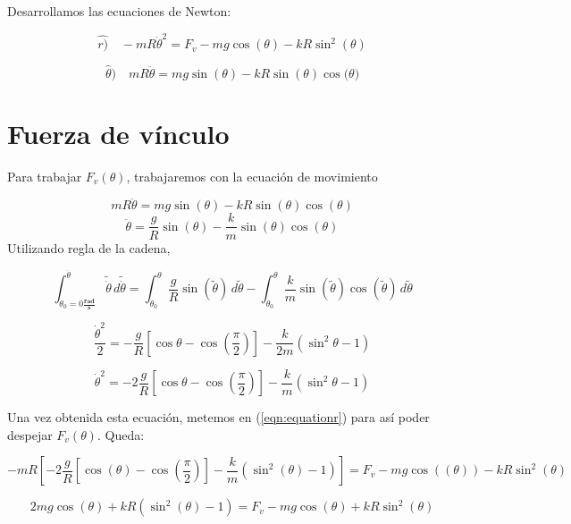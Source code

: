 \documentclass{article}
\begin{document}
	Desarrollamos las ecuaciones de Newton:
	
	\begin{equation}
	\label{eqn:equationr}
		\hat{r)} \quad -mR\dot{\theta}^2 = F_v - mg \cos{(\theta)} - kR \sin^2{(\theta)}
	\end{equation}
    
    \begin{equation}
    \label{eqn:equationtheta}
    	\hat{\theta}) \quad mR\ddot{\theta} = mg \sin{(\theta)} - kR \sin{(\theta)} \cos{(\theta})
    \end{equation}
    
    \section{Fuerza de v\'inculo}
    
    Para trabajar $F_v(\theta)$, trabajaremos con la ecuaci\'on de movimiento
    
    $$mR\ddot{\theta} = mg \sin{(\theta)} - kR \sin{(\theta)} \cos{(\theta)}$$
    $$\ddot{\theta} = \frac{g}{R} \sin{(\theta)} - \frac{k}{m} \sin{(\theta)} \cos{(\theta)}$$
   	Utilizando regla de la cadena,
   	
   	 $$ \int_{\dot{\theta}_0 = 0 \frac{\textbf{rad}}{\textbf{s}}}^{\dot{\theta}} \! \tilde{\dot{\theta}} \, d\tilde{\dot{\theta}} =
   	 	\int_{\theta_0}^{\theta} \! \frac{g}{R} \sin{(\tilde{\theta})} \, d\tilde{\theta} -
   	 	\int_{\theta_0}^{\theta} \! \frac{k}{m} \sin{(\tilde{\theta})} \cos{(\tilde{\theta})} \, d\tilde{\theta}$$
   	 	
   	 $$ \frac{\dot{\theta}^2}{2} =
   	 	-\frac{g}{R} \left[ \cos{\theta} - \cos{\left(\frac{\pi}{2}\right)} \right] - \frac{k}{2m}(\sin^2{\theta} - 1) $$
   	 	
   	 $$ \dot{\theta}^2 =
   	 	-2\frac{g}{R} \left[ \cos{\theta} - \cos{\left(\frac{\pi}{2}\right)} \right] - \frac{k}{m}(\sin^2{\theta} - 1) $$
   	 	
   	 Una vez obtenida esta ecuaci\'on, metemos en (\ref{eqn:equationr}) para as\'i poder despejar $F_v(\theta)$. Queda:
   	 
   	 $$
   	 -mR\left[-2\frac{g}{R} \left[ \cos{(\theta)} - \cos{\left(\frac{\pi}{2}\right)} \right] - \frac{k}{m}(\sin^2{(\theta)} - 1)\right] = F_v - mg \cos{((\theta))} - kR \sin^2{(\theta)}
   	 $$
   	 
   	 $$
   	 	2mg \cos{(\theta)} + kR(\sin^2{(\theta)} - 1) = F_v - mg\cos{(\theta)} + kR\sin^2{(\theta)}
   	 $$
   	 
\end{document}
